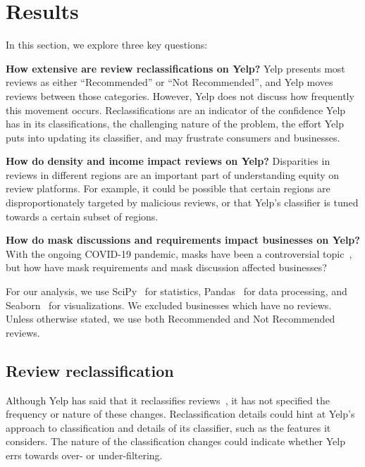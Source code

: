 \section{Results} \label{sec:results}

In this section, we explore three key questions:

\textbf{How extensive are review reclassifications on Yelp?} Yelp presents most reviews as either ``Recommended'' or ``Not Recommended'', and Yelp moves reviews between those categories. However, Yelp does not discuss how frequently this movement occurs. Reclassifications are an indicator of the confidence Yelp has in its classifications, the challenging nature of the problem, the effort Yelp puts into updating its classifier, and may frustrate consumers and businesses.

\textbf{How do density and income impact reviews on Yelp?} Disparities in reviews in different regions
are an important part of understanding equity on review platforms. For example, it could be possible that certain regions are disproportionately targeted by malicious reviews, or that Yelp's classifier is tuned towards a certain subset of regions.

\textbf{How do mask discussions and requirements impact businesses on Yelp?} With the ongoing COVID-19 pandemic, masks have been a controversial topic~\cite{pascual2021toxicity}, but how have mask requirements and mask discussion affected businesses?

For our analysis, we use SciPy~\cite{2020SciPy-NMeth} for statistics, Pandas~\cite{mckinney-proc-scipy-2010} for data processing, and Seaborn~\cite{waskom2020seaborn} for visualizations. We excluded businesses which have no reviews. Unless otherwise stated, we use both Recommended and Not Recommended reviews.


\subsection{Review reclassification} \label{subsec:review_reclassification}


Although Yelp has said that it reclassifies reviews~\cite{yelp2010recommend}, it has not specified the frequency or nature of these changes. Reclassification details could hint at Yelp's approach to classification and details of its classifier, such as the features it considers. The nature of the classification changes could indicate whether Yelp errs towards over- or under-filtering.

